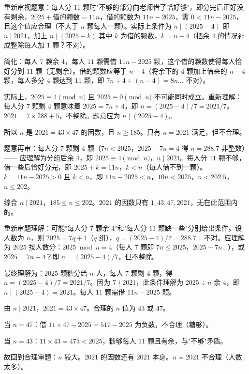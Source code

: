 \documentclass[12pt, a4paper]{ctexart}
\begin{document}
重新审视题意：每人分 $11$ 颗时"不够的部分向老师借了恰好够"，即分完后正好没有剩余，$2025 + \text{借的颗数} = 11n$，借的颗数为 $11n - 2025$，需 $0 < 11n - 2025$，且这个值应合理（不大于 $n$ 颗每人一颗）。实际上条件为 $n \mid (2025 - 4)$ 即 $n \mid 2021$，加上 $n \mid (2025 + k)$ 其中 $k$ 为借的颗数，$k = n - 4$（把余 $4$ 的情况补成整除每人加 $1$ 颗？不对）。

简化：每人 $7$ 颗余 $4$，每人 $11$ 颗需借 $11n - 2025$ 颗，这个借的颗数使得每人恰好分到 $11$ 颗（无剩余）。借的颗数应等于 $n - 4$（将余下的 $4$ 颗加上借来的 $n-4$ 颗，每人多分 $4$ 颗达到 $11$ 颗，即 $7n + 4 + (n - 4) = 8n$... 不对）。

实际上，$2025 \equiv 4 \pmod{n}$ 且 $2025 \equiv 0 \pmod{n}$ 不可能同时成立。重新理解：每人分 $7$ 颗剩 $4$ 颗意味着 $2025 = 7n + 4$，即 $n = (2025 - 4)/7 = 2021/7$。$2021 = 7 \times 288 + 5$，不整除。题意应为 $n \mid (2025 - 4)$。

所以 $n$ 是 $2021 = 43 \times 47$ 的因数，且 $n \geqslant 185$。只有 $n = 2021$ 满足，但不合理。

题意再审：每人分 $7$ 颗剩 $4$ 颗（$7n < 2025$，$2025 - 7n = 4$ 得 $n = 288.7$ 非整数）—— 应理解为分组后余 $4$，即 $2025 \equiv 4 \pmod{n}$，$n \mid 2021$。每人分 $11$ 颗不够，借一些后恰好分完，即 $2025 + k = 11n$，$k < n$（每人借不到一颗）。$k = 11n - 2025 > 0$ 且 $k < n$，即 $11n - 2025 < n$，$10n < 2025$，$n < 202.5$，$n \leqslant 202$。

综合 $n \mid 2021$，$185 \leqslant n \leqslant 202$。$2021$ 的因数只有 $1, 43, 47, 2021$，无在此范围内的。

重新审题理解：可能"每人分 $7$ 颗余 $4$"和"每人分 $11$ 颗缺一些"分别给出条件。设人数为 $n$，则 $2025 = 7q + 4$（$q$ 组），$q = (2025-4)/7 = 288.7$... 不对。应理解为 $2025$ 按人数分：$2025 \bmod n = 4$（每人 $7$ 颗即 $7n \leqslant 2025$，$2025 - 7n$...），或 $2025 = 7n + 4$？即 $n = (2025 - 4)/7$，但不整除。

最终理解为：$2025$ 颗糖分给 $n$ 人，每人 $7$ 颗剩 $4$ 颗，得 $n = (2025 - 4)/7 = 2021/7$。因为 $7 \nmid 2021$，此条件理解为 $2025 \div n$ 余 $4$，即 $n \mid (2025 - 4) = 2021$。每人 $11$ 颗需借 $11n - 2025$ 颗。

由 $n \mid 2021$，$2021 = 43 \times 47$。合理的 $n$ 值为 $43$ 或 $47$。

当 $n = 47$：借 $11 \times 47 - 2025 = 517 - 2025$ 为负数，不合理（糖够）。

当 $n = 43$：$11 \times 43 = 473 < 2025$，糖够每人 $11$ 颗且有余，与"不够"矛盾。

故回到合理审题：$n$ 较大。$2021$ 的因数还有 $2021$ 本身。$n = 2021$ 不合理（人数太多）。
\end{document}
